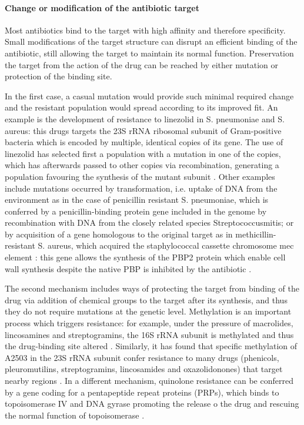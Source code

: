 \paragraph{Change or modification of the antibiotic target}
Most antibiotics bind to the target with high affinity and therefore specificity. Small modifications of the target structure can disrupt an efficient binding of the antibiotic, still allowing the target to maintain its normal function. Preservation the target from the action of the drug can be reached by either mutation or protection of the binding site.

In the first case, a casual mutation would provide such minimal required change and the resistant population would spread according to its improved fit.
%
An example is the development of resistance to linezolid in S. pneumoniae and S. aureus: this drugs targets the 23S rRNA ribosomal subunit of Gram-positive bacteria which is encoded by multiple, identical copies of its gene. The use of linezolid has selected first a population with a mutation in one of the copies, which has afterwards passed to other copies via recombination, generating a population favouring the synthesis of the mutant subunit \cite{Billal2011,Gao2010}.
%
Other examples include mutations occurred by transformation, i.e. uptake of DNA from the environment as in the case of  penicillin resistant S. pneumoniae, which is conferred by a penicillin-binding protein gene included in the genome by recombination with DNA from the closely related species Streptococcusmitis; or by acquisition of a gene homologous to the original target as in methicillin-resistant S. aureus, which acquired the staphylococcal cassette chromosome mec element \cite{Shore2011}: this gene allows the synthesis of the PBP2 protein which enable cell wall synthesis despite the native PBP is inhibited by the antibiotic \cite{Katayama2000}.

The second mechanism includes ways of protecting the target from binding of the drug via addition of chemical groups to the target after its synthesis, and thus they do not require mutations at the genetic level.
%
Methylation is an important process which triggers resistance: for example, under the pressure of macrolides, lincosamines and streptogramins, the 16S rRNA subunit is methylated and thus the drug-binding site altered \cite{Kumar2014}. Similarly, it has found that specific methylation of A2503 in the 23S rRNA subunit confer resistance to many drugs (phenicols, pleuromutilins, streptogramins, lincosamides and oxazolidonones) that target nearby regions \cite{Long2006}.
%
In a different mechanism, quinolone resistance can be conferred by a gene coding for a pentapeptide repeat proteins (PRPs), which binds to topoisomerase IV and DNA gyrase promoting the release o the drug and rescuing the normal function of topoisomerase \cite{Vetting2011}.

